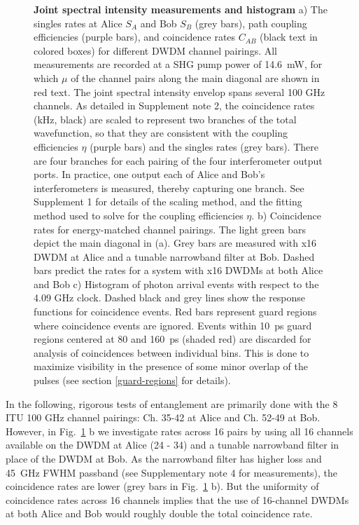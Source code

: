 \documentclass[11pt]{caltech_thesis} %
\begin{document}
{\begin{figure}
\caption[{Joint spectral intensity measurements and histogram}]{\textbf{Joint spectral intensity measurements and histogram} a) The singles rates at Alice $S_A$ and Bob $S_B$ (grey bars), path coupling efficiencies (purple bars), and coincidence rates $C_{AB}$ (black text in colored boxes) for different DWDM channel pairings. All measurements are recorded at a SHG pump power of 14.6~mW, for which $\mu$ of the channel pairs along the main diagonal are shown in red text. The joint spectral intensity envelop spans several 100 GHz channels. As detailed in Supplement note 2, the coincidence rates (kHz, black) are scaled to represent two branches of the total wavefunction, so that they are consistent with the coupling efficiencies $\eta$ (purple bars) and the singles rates (grey bars). There are four branches for each pairing of the four interferometer output ports. In practice, one output each of Alice and Bob's interferometers is measured, thereby capturing one branch. See Supplement 1 for details of the scaling method, and the fitting method used to solve for the coupling efficiencies $\eta$. b) Coincidence rates for energy-matched channel pairings. The light green bars depict the main diagonal in (a). Grey bars are measured with x16 DWDM at Alice and a tunable narrowband filter at Bob. Dashed bars predict the rates for a system with x16 DWDMs at both Alice and Bob c) Histogram of photon arrival events with respect to the 4.09 GHz clock. Dashed black and grey lines show the response functions for coincidence events. Red bars represent guard regions where coincidence events are ignored. Events within 10~ps guard regions centered at 80 and 160~ps (shaded red) are discarded for analysis of coincidences between individual bins. This is done to maximize visibility in the presence of some minor overlap of the pulses (see section \ref{guard-regions} for details).}
\label{fig:figure_2nd_1}
\end{figure}
}

In the following, rigorous tests of entanglement are primarily done with the 8 ITU 100 GHz channel pairings: Ch. 35-42 at Alice and Ch. 52-49 at Bob. However, in Fig.~\ref{fig:figure_2nd_1} b we investigate rates across 16 pairs by using all 16 channels available on the DWDM at Alice (24 - 34) and a tunable narrowband filter in place of the DWDM at Bob. As the narrowband filter has higher loss and 45~GHz FWHM passband (see Supplementary note 4 for measurements), the coincidence rates are lower (grey bars in Fig.~\ref{fig:figure_2nd_1} b). But the uniformity of coincidence rates across 16 channels implies that the use of 16-channel DWDMs at both Alice and Bob would roughly double the total coincidence rate.
\end{document}
